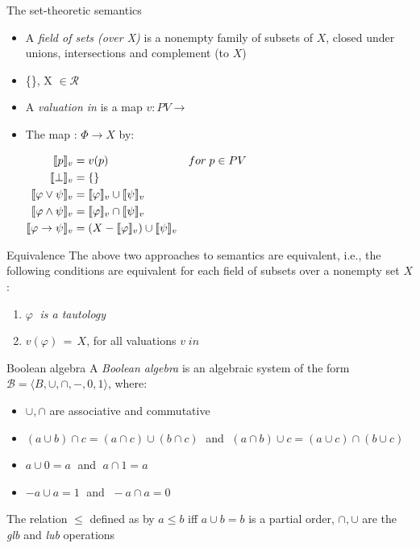 \documentclass[sans]{beamer}
\begin{document}
\begin{frame}{The set-theoretic semantics}
  \begin{itemize}
    \item A \emph{field of sets (over X)} is a nonempty family \calr
      of subsets of $X$, closed under unions, intersections and complement (to $X$)
    
    \item \{\}, X $\in \mathcal{R}$
    
    \item A \emph{valuation in} \calr is a map $v: PV \to$ \calr
      
    \vfill

    \item The map \vmsem{\bullet} : $\Phi \to X$ by:

      $\begin{aligned}
        \llbracket p \rrbracket_v &= v(p) & for \; p \in PV \\
        \llbracket \bot \rrbracket_v &= \{\} \\
        \llbracket \varphi \vee \psi \rrbracket_v &= \llbracket \varphi \rrbracket_v \cup \llbracket \psi \rrbracket_v \\
        \llbracket \varphi \wedge \psi \rrbracket_v &= \llbracket \varphi \rrbracket_v \cap \llbracket \psi \rrbracket_v\\
        \llbracket \varphi \to \psi \rrbracket_v &= (X - \llbracket \varphi \rrbracket_v) \cup \llbracket \psi \rrbracket_v
       \end{aligned}$
  \end{itemize}
\end{frame}

\begin{frame}{Equivalence}
  The above two approaches to semantics are equivalent, i.e., the following conditions
  are equivalent for each field of subsets \calr over a nonempty set $X$:
  \begin{enumerate}
    \item $\varphi \;$ \emph{is a tautology}
    \item $v(\varphi) \,=\, X$, for all valuations $v \; in \; $\calr
  \end{enumerate}
\end{frame}

\begin{frame}{Boolean algebra}
  A \emph{Boolean algebra} is an algebraic system of the form
  $\mathcal{B} = \langle B, \cup, \cap, -, 0, 1\rangle$, where:
  \begin{itemize}
    \item $\cup, \cap$ are associative and commutative
    \item $(a \cup b) \cap c = (a \cap c) \cup (b \cap c) \;$ and
          $\; (a \cap b) \cup c = (a \cup c) \cap (b \cup c)$
    \item $a \cup 0 = a \;$ and $\; a \cap 1 = a$
    \item $-a \cup a = 1 \;$ and $\; -a \cap a = 0\;$
  \end{itemize}

  \vfill
  
  The relation $\leq$ defined as by $a \leq b$ iff $a \cup b = b$ is a partial order,
  $\cap, \cup$ are the \emph{glb} and \emph{lub} operations
\end{frame} 
\end{document}
